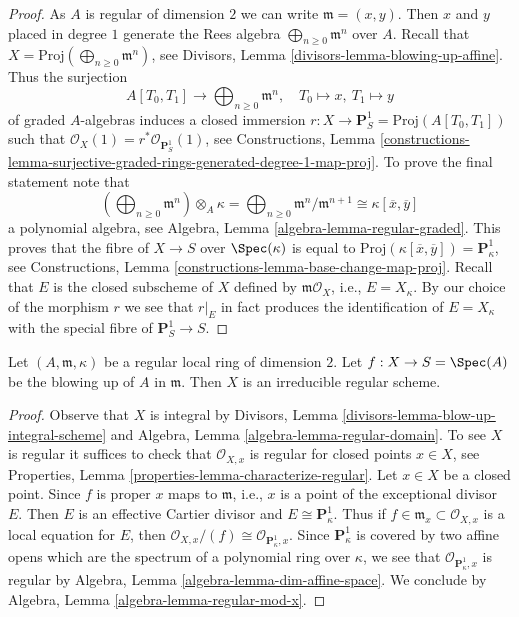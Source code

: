 \begin{proof}
As $A$ is regular of dimension $2$ we can write $\mathfrak m = (x, y)$.
Then $x$ and $y$ placed in degree $1$ generate the Rees algebra
$\bigoplus_{n \geq 0} \mathfrak m^n$ over $A$. Recall that
$X = \text{Proj}(\bigoplus_{n \geq 0} \mathfrak m^n)$, see
Divisors, Lemma \ref{divisors-lemma-blowing-up-affine}.
Thus the surjection
$$
A[T_0, T_1] \longrightarrow \bigoplus\nolimits_{n \geq 0} \mathfrak m^n,
\quad
T_0 \mapsto x,\ T_1 \mapsto y
$$
of graded $A$-algebras induces a closed immersion
$r : X \to \mathbf{P}^1_S = \text{Proj}(A[T_0, T_1])$
such that $\mathcal{O}_X(1) = r^*\mathcal{O}_{\mathbf{P}^1_S}(1)$, see
Constructions, Lemma
\ref{constructions-lemma-surjective-graded-rings-generated-degree-1-map-proj}.
To prove the final statement note that
$$
\left(\bigoplus\nolimits_{n \geq 0} \mathfrak m^n\right) \otimes_A \kappa =
\bigoplus\nolimits_{n \geq 0} \mathfrak m^n/\mathfrak m^{n + 1} \cong
\kappa[\overline{x}, \overline{y}]
$$
a polynomial algebra, see Algebra, Lemma \ref{algebra-lemma-regular-graded}.
This proves that the fibre of $X \to S$ over $\Spec(\kappa)$ is equal to
$\text{Proj}(\kappa[\overline{x}, \overline{y}]) = \mathbf{P}^1_\kappa$, see
Constructions, Lemma \ref{constructions-lemma-base-change-map-proj}.
Recall that $E$ is the closed subscheme of $X$ defined by
$\mathfrak m\mathcal{O}_X$, i.e., $E = X_\kappa$.
By our choice of the morphism $r$ we see that $r|_E$ in fact
produces the identification of $E = X_\kappa$ with the special
fibre of $\mathbf{P}^1_S \to S$.
\end{proof}

\begin{lemma}
\label{lemma-blowup-regular}
Let $(A, \mathfrak m, \kappa)$ be a regular local ring of dimension $2$.
Let $f : X \to S = \Spec(A)$ be the blowing up of $A$ in $\mathfrak m$.
Then $X$ is an irreducible regular scheme.
\end{lemma}

\begin{proof}
Observe that $X$ is integral by
Divisors, Lemma \ref{divisors-lemma-blow-up-integral-scheme}
and
Algebra, Lemma \ref{algebra-lemma-regular-domain}.
To see $X$ is regular it suffices to check that $\mathcal{O}_{X, x}$
is regular for closed points $x \in X$, see
Properties, Lemma \ref{properties-lemma-characterize-regular}.
Let $x \in X$ be a closed point. Since $f$ is proper $x$ maps to
$\mathfrak m$, i.e., $x$ is a point of the exceptional divisor $E$.
Then $E$ is an effective Cartier divisor and $E \cong \mathbf{P}^1_\kappa$.
Thus if $f \in \mathfrak m_x \subset \mathcal{O}_{X, x}$ is a local
equation for $E$, then
$\mathcal{O}_{X, x}/(f) \cong \mathcal{O}_{\mathbf{P}^1_\kappa, x}$.
Since $\mathbf{P}^1_\kappa$ is covered by two affine opens which are the
spectrum of a polynomial ring over $\kappa$, we see that
$\mathcal{O}_{\mathbf{P}^1_\kappa, x}$ is regular by
Algebra, Lemma \ref{algebra-lemma-dim-affine-space}.
We conclude by
Algebra, Lemma \ref{algebra-lemma-regular-mod-x}.
\end{proof}

